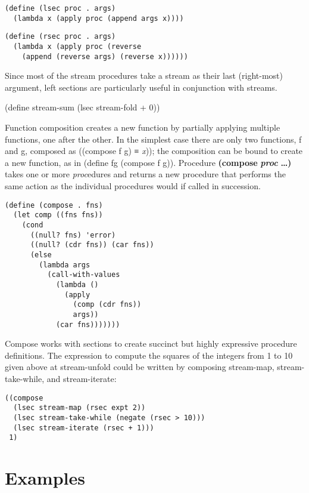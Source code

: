 \begin{verbatim}
(define (lsec proc . args)
  (lambda x (apply proc (append args x))))
\end{verbatim}

\begin{verbatim}
(define (rsec proc . args)
  (lambda x (apply proc (reverse
    (append (reverse args) (reverse x))))))
\end{verbatim}

Since most of the stream procedures take a stream as their last
(right-most) argument, left sections are particularly useful in
conjunction with streams.

(define stream-sum (lsec stream-fold + 0))

Function composition creates a new function by partially applying
multiple functions, one after the other. In the simplest case there are
only two functions, f and g, composed as ((compose f g) ≡ \emph{x}));
the composition can be bound to create a new function, as in (define fg
(compose f g)). Procedure \textbf{(compose} \textbf{\emph{proc}}
\textbf{\ldots{})} takes one or more \emph{proc}edures and returns a new
procedure that performs the same action as the individual procedures
would if called in succession.

\begin{verbatim}
(define (compose . fns)
  (let comp ((fns fns))
    (cond
      ((null? fns) 'error)
      ((null? (cdr fns)) (car fns))
      (else
        (lambda args
          (call-with-values
            (lambda ()
              (apply
                (comp (cdr fns))
                args))
            (car fns)))))))
\end{verbatim}

Compose works with sections to create succinct but highly expressive
procedure definitions. The expression to compute the squares of the
integers from 1 to 10 given above at stream-unfold could be written by
composing stream-map, stream-take-while, and stream-iterate:

\begin{verbatim}
((compose
  (lsec stream-map (rsec expt 2))
  (lsec stream-take-while (negate (rsec > 10)))
  (lsec stream-iterate (rsec + 1)))
 1)
\end{verbatim}

\section{Examples}\label{examples}

